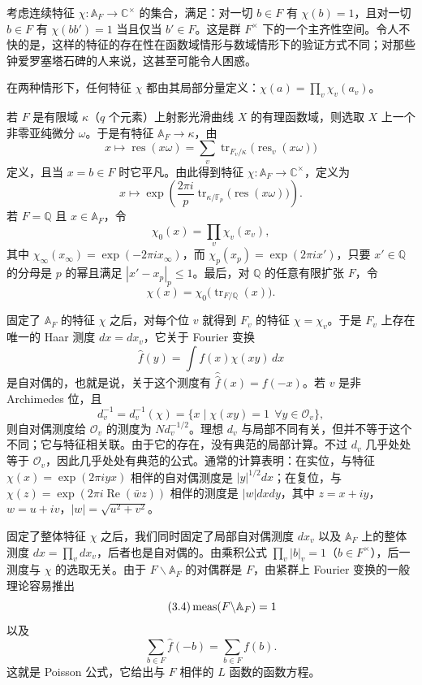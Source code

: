考虑连续特征 $\chi:\mathbb A_F\to\mathbb C^\times$ 的集合，满足：对一切 $b\in F$ 有 $\chi(b)=1$，且对一切 $b\in F$ 有 $\chi(bb')=1$ 当且仅当 $b'\in F$。这是群 $F^\times$ 下的一个主齐性空间。令人不快的是，这样的特征的存在性在函数域情形与数域情形下的验证方式不同；对那些钟爱罗塞塔石碑的人来说，这甚至可能令人困惑。

在两种情形下，任何特征 $\chi$ 都由其局部分量定义：$\chi(a)=\prod_v\chi_v(a_v)$。

若 $F$ 是有限域 $\kappa$（$q$ 个元素）上射影光滑曲线 $X$ 的有理函数域，则选取 $X$ 上一个非零亚纯微分 $\omega$。于是有特征 $\mathbb A_F\to\kappa$，由
\[
x\longmapsto\operatorname{res}(x\omega)=\sum_v\operatorname{tr}_{F_v/\kappa}\bigl(\operatorname{res}_v(x\omega)\bigr)
\]
定义，且当 $x=b\in F$ 时它平凡。由此得到特征 $\chi:\mathbb A_F\to\mathbb C^\times$，定义为
\begin{equation}\tag{3.2}
x\longmapsto\exp\left(\frac{2\pi i}{p}\operatorname{tr}_{\kappa/\mathbb F_p}\bigl(\operatorname{res}(x\omega)\bigr)\right).
\end{equation}
若 $F=\mathbb Q$ 且 $x\in\mathbb A_F$，令
\[
\chi_0(x)=\prod_v\chi_v(x_v),
\]
其中 $\chi_\infty(x_\infty)=\exp(-2\pi ix_\infty)$，而 $\chi_p(x_p)=\exp(2\pi ix')$，只要 $x'\in\mathbb Q$ 的分母是 $p$ 的幂且满足 $|x'-x_p|_p\le1$。最后，对 $\mathbb Q$ 的任意有限扩张 $F$，令
\begin{equation}\tag{3.3}
\chi(x)=\chi_0\bigl(\operatorname{tr}_{F/\mathbb Q}(x)\bigr).
\end{equation}

固定了 $\mathbb A_F$ 的特征 $\chi$ 之后，对每个位 $v$ 就得到 $F_v$ 的特征 $\chi=\chi_v$。于是 $F_v$ 上存在唯一的 Haar 测度 $dx=dx_v$，它关于 Fourier 变换
\[
\hat f(y)=\int f(x)\chi(xy)\,dx
\]
是自对偶的，也就是说，关于这个测度有 $\hat{\hat f}(x)=f(-x)$。若 $v$ 是非 Archimedes 位，且
\[
d_v^{-1}=d_v^{-1}(\chi)=\{x\mid\chi(xy)=1\ \ \forall y\in\mathcal O_v\},
\]
则自对偶测度给 $\mathcal O_v$ 的测度为 $N d_v^{-1/2}$。理想 $d_v$ 与局部不同有关，但并不等于这个不同；它与特征相关联。由于它的存在，没有典范的局部计算。不过 $d_v$ 几乎处处等于 $\mathcal O_v$，因此几乎处处有典范的公式。通常的计算表明：在实位，与特征 $\chi(x)=\exp(2\pi iyx)$ 相伴的自对偶测度是 $|y|^{1/2}dx$；在复位，与 $\chi(z)=\exp(2\pi i\operatorname{Re}(\bar wz))$ 相伴的测度是 $|w|dxdy$，其中 $z=x+iy$，$w=u+iv$，$|w|=\sqrt{u^2+v^2}$。

固定了整体特征 $\chi$ 之后，我们同时固定了局部自对偶测度 $dx_v$ 以及 $\mathbb A_F$ 上的整体测度 $dx=\prod_v dx_v$，后者也是自对偶的。由乘积公式 $\prod_v|b|_v=1$（$b\in F^\times$），后一测度与 $\chi$ 的选取无关。由于 $F\backslash\mathbb A_F$ 的对偶群是 $F$，由紧群上 Fourier 变换的一般理论容易推出
\begin{equation}\tag{3.4}
\operatorname{meas}(F\backslash\mathbb A_F)=1
\end{equation}
以及
\[
\sum_{b\in F}\hat f(-b)=\sum_{b\in F}f(b).
\]
这就是 Poisson 公式，它给出与 $F$ 相伴的 $L$ 函数的函数方程。

